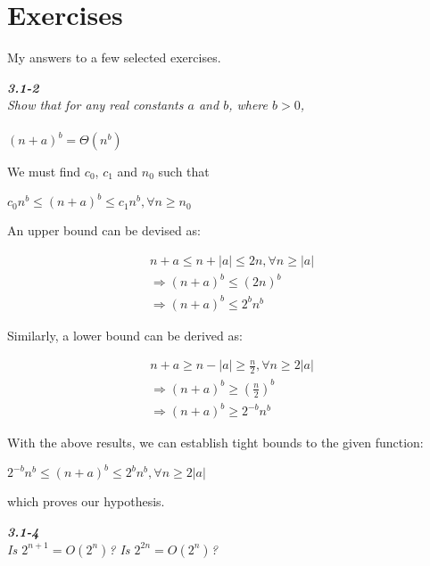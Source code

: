 \documentclass[8pt,a4paper]{article}
\begin{document}
\section*{Exercises}
My answers to a few selected exercises.

\begin{framed}
\textbf{\textit{3.1-2}} \\
\textit{Show that for any real constants $a$ and $b$, where $b > 0$, \
\\
\\
$(n + a)^{b} = \Theta(n^{b})$}
\end{framed}

We must find $c_{0}$, $c_{1}$ and $n_{0}$ such that

\begin{center}
  $c_{0}n^{b} \leq (n + a)^{b} \leq c_{1}n^{b}, \forall n \geq n_{0}$
\end{center}

An upper bound can be devised as:

\begin{equation*}
  \begin{split}
    n + a \leq n + |a| \leq 2n, \forall n \geq |a| \\
    \Rightarrow (n + a)^{b} \leq (2n)^{b} \\
    \Rightarrow (n + a)^{b} \leq 2^{b}n^{b}
  \end{split}
\end{equation*}

Similarly, a lower bound can be derived as:

\begin{equation*}
  \begin{split}
    n + a \geq n - |a| \geq \frac{n}{2}, \forall n \geq 2|a| \\
    \Rightarrow (n + a)^{b} \geq \left(\frac{n}{2}\right)^{b} \\
    \Rightarrow (n + a)^{b} \geq 2^{-b}n^{b}
  \end{split}
\end{equation*}

With the above results, we can establish tight bounds to the given function:

\begin{center}
  $2^{-b}n^{b} \leq (n + a)^{b} \leq 2^{b}n^{b}, \forall n \geq 2|a|$
\end{center}

which proves our hypothesis.

\begin{framed}
\textbf{\textit{3.1-4}} \\
\textit{Is $2^{n + 1} = O(2^{n})$? Is $2^{2n} = O(2^{n})$?}
\end{framed}
\end{document}
